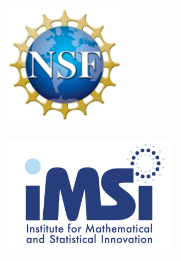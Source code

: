 \begin{center}

	    \begin{minipage}{0.2\textwidth}
		\centering
		\includegraphics[height=3cm]{Photos/nsf_logo.png}
	\end{minipage}
	\begin{minipage}{0.2\textwidth}
		\centering
		\includegraphics[height=3cm]{Photos/imsi_logo.png}
	\end{minipage} \\[1em]


\end{center}
